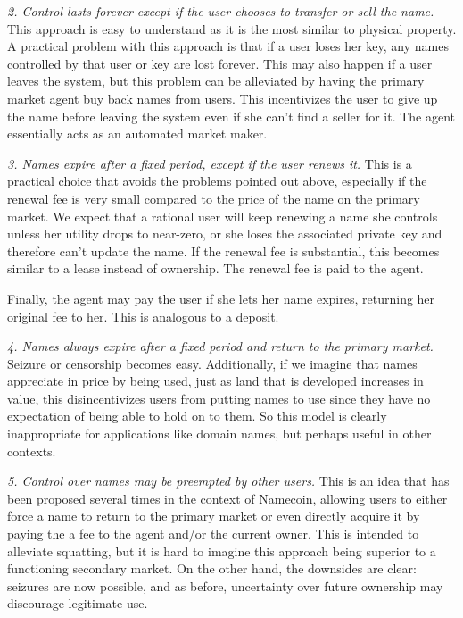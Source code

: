 {\em 2. Control lasts forever except if the user chooses to transfer or sell the name.} This approach is easy to understand as it is the most similar to physical property. A practical problem with this approach is that if a user loses her key, any names controlled by that user or key are lost forever. This may also happen if a user leaves the system, but this problem can be alleviated by having the primary market agent buy back names from users. This incentivizes the user to give up the name before leaving the system even if she can't find a seller for it. The agent essentially acts as an automated market maker.

{\em 3. Names expire after a fixed period, except if the user renews it.} This is a practical choice that avoids the problems pointed out above, especially if the renewal fee is very small compared to the price of the name on the primary market. We expect that a rational user will keep renewing a name she controls unless her utility drops to near-zero, or she loses the associated private key and therefore can't update the name. If the renewal fee is substantial, this becomes similar to a lease instead of ownership. The renewal fee is paid to the agent. 

Finally, the agent may pay the user if she lets her name expires, returning her original fee to her. This is analogous to a deposit.

{\em 4. Names always expire after a fixed period and return to the primary market.} 
Seizure or censorship becomes easy. Additionally, if we imagine that names appreciate in price by being used, just as land that is developed increases in value, this disincentivizes users from putting names to use since they have no expectation of being able to hold on to them. 
So this model is clearly inappropriate for applications like domain names, but perhaps useful in other contexts. 


{\em 5. Control over names may be preempted by other users.} 
This is an idea that has been proposed  several times in the context of Namecoin, allowing users to either force a name to return to the primary market or even directly acquire it by paying the a fee to the agent and/or the current owner. This is intended to alleviate squatting, but it is hard to imagine this approach being superior to a functioning secondary market. On the other hand, the downsides are clear: seizures are now possible, and as before, uncertainty over future ownership may discourage legitimate use.

